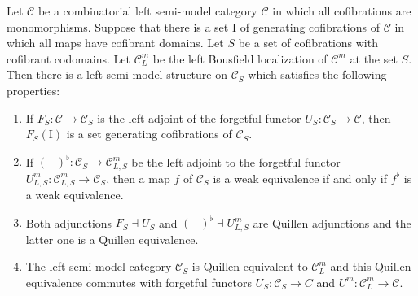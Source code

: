 \documentclass[reqno]{amsart}
\theoremstyle{definition}
\theoremstyle{remark}
\newcommand{\fs}[1]{\mathrm{#1}}
\newcommand{\cat}[1]{\mathcal{#1}}
\newcommand{\C}{\cat{C}}
\newcommand{\I}{\fs{I}}
\numberwithin{figure}{section}
\begin{document}
\begin{thm}
Let $\C$ be a combinatorial left semi-model category $\C$ in which all cofibrations are monomorphisms.
Suppose that there is a set $\I$ of generating cofibrations of $\C$ in which all maps have cofibrant domains.
Let $S$ be a set of cofibrations with cofibrant codomains.
Let $\C^m_L$ be the left Bousfield localization of $\C^m$ at the set $S$.
Then there is a left semi-model structure on $\C_S$ which satisfies the following properties:
\begin{enumerate}
\item \label{it:alg-cof} If $F_S : \C \to \C_S$ is the left adjoint of the forgetful functor $U_S : \C_S \to \C$, then $F_S(\I)$ is a set generating cofibrations of $\C_S$.
\item \label{it:alg-we} If $(-)^\flat : \C_S \to \C^m_{L,S}$ be the left adjoint to the forgetful functor $U^m_{L,S} : \C^m_{L,S} \to \C_S$, then a map $f$ of $\C_S$ is a weak equivalence if and only if $f^\flat$ is a weak equivalence.
\item Both adjunctions $F_S \dashv U_S$ and $(-)^\flat \dashv U^m_{L,S}$ are Quillen adjunctions and the latter one is a Quillen equivalence.
\item The left semi-model category $\C_S$ is Quillen equivalent to $\C^m_L$ and this Quillen equivalence commutes with forgetful functors $U_S : \C_S \to C$ and $U^m : \C^m_L \to \C$.
\end{enumerate}
\end{thm}
\end{document}
